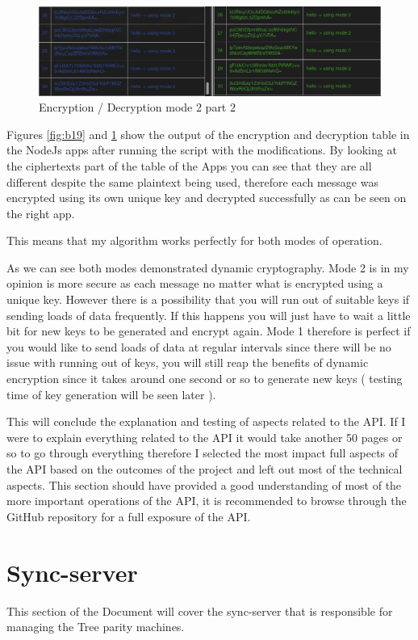 \begin{figure}[!h]
  \centering
      \includegraphics[width=1\textwidth]{Figures/b20.png}
  \caption[Encryption / Decryption mode 2 part 2]{Encryption / Decryption mode 2 part 2}
  \label{fig:b20}
\end{figure}
\FloatBarrier
Figures \ref{fig:b19} and \ref{fig:b20} show the output of the encryption and decryption table in the NodeJs apps after running the script with the modifications.
By looking at the ciphertexts part of the table of the Apps you can see that they are all different despite the same plaintext being used, therefore each message was encrypted using its own unique key and decrypted successfully as can be seen on the right app. 

This means that my algorithm works perfectly for both modes of operation.

As we can see both modes demonstrated dynamic cryptography. Mode 2 is in my opinion is more secure as each message no matter what is encrypted using a unique key. However there is a possibility that you will run out of suitable keys if sending loads of data frequently. If this happens you will just have to wait a little bit for new keys to be generated and encrypt again. 
Mode 1 therefore is perfect if you would like to send loads of data at regular intervals since there will be no issue with running out of keys, you will still reap the benefits of dynamic encryption since it takes around one second or so to generate new keys ( testing time of key generation will be seen later ). 

This will conclude the explanation and testing of aspects related to the API. If I were to explain everything related to the API it would take another 50 pages or so to go through everything therefore I selected the most impact full aspects of the API based on the outcomes of the project and left out most of the technical aspects. This section should have provided a good understanding of most of the more important operations of the API, it is recommended to browse through the GitHub repository for a full exposure of the API.

\section{Sync-server}
This section of the Document will cover the sync-server that is responsible for managing the Tree parity machines. 













 